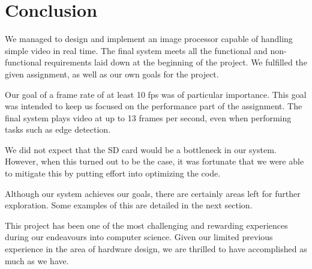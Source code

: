 \section{Conclusion}

We managed to design and implement an image processor capable of handling simple
video in real time. The final system meets all the functional and non-functional
requirements laid down at the beginning of the project. We fulfilled the given
assignment, as well as our own goals for the project.

Our goal of a frame rate of at least 10 fps was of particular importance. This
goal was intended to keep us focused on the performance part of the
assignment. The final system plays video at up to 13 frames per second, even when
performing tasks such as edge detection.

We did not expect that the SD card would be a bottleneck in our system. However,
when this turned out to be the case, it was fortunate that we were able to
mitigate this by putting effort into optimizing the code.

Although our system achieves our goals, there are certainly areas left for
further exploration. Some examples of this are detailed in the next section.

This project has been one of the most challenging and rewarding experiences
during our endeavours into computer science. Given our limited previous
experience in the area of hardware design, we are thrilled to have accomplished
as much as we have.

